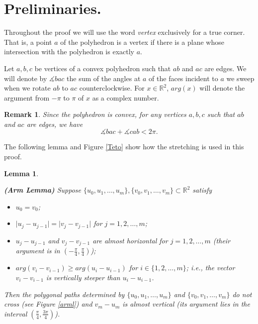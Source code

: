 \documentclass{article}
\theoremstyle{theorem}
\newtheorem{lema}[teorema]{Lemma}
\newtheorem{rem}[teorema]{Remark}
\newcommand{\field}[1]{\ensuremath{\mathbb{#1}}}
\newcommand{\R}{\field{R}}
\begin{document}
\section*{Preliminaries.}

Throughout the proof we will use the word \textit{vertex} exclusively for a true corner. That is, a point $a$ of the polyhedron is a vertex if there is a plane whose intersection with the polyhedron is exactly $a$.


Let $a, b, c$ be vertices of a convex polyhedron such that $ab $ and $ac$ are edges. We will denote by $\measuredangle bac $ the sum of the angles at $a$ of the faces incident to $a$ we sweep when we rotate $ab$ to $ac$ counterclockwise. For $x \in \R^2$, $arg (x)$ will denote the argument from $-\pi$ to $\pi$ of $x$ as a complex number.%

\begin{rem}
{\rm Since the polyhedron is convex, for any vertices $a,b,c$ such that $ab$ and $ac$ are edges, we have
\begin{equation}\label{Alex}
\measuredangle bac + \measuredangle  cab  < 2\pi.
\end{equation} 
}
 \end{rem}

The following lemma and Figure \ref{Teto} show how the stretching is used in this proof.

\begin{lema} \label{Arm}
{\textbf{(Arm Lemma)} Suppose $\{ u_0, u_1, \ldots , u_m     \}, \{ v_0, v_1, \ldots , v_m      \} \subset \R^2$ satisfy
\begin{itemize}
\item $u_0 = v_0$;
\item $\vert u_j - u_{j-1} \vert = \vert v_j - v_{j-1}  \vert$ for $j=1,2, \ldots, m$;
\item $u_{j }- u_{j-1} $ and $v_j - v_{j-1} $ are almost horizontal for $j = 1, 2, \ldots , m$ (their argument is in $\left( -\frac{\pi}{4},\frac{\pi}{4} \right)$); 
\item $arg (v_{i} - v_{i-1} )\geq arg (u_{i} - u_{i-1})$ for $i \in \{ 1, 2, \ldots, m \} $; i.e., the vector $v_i - v_{i-1} $ is vertically steeper than $u_i-u_{i-1}$. 
\end{itemize}

\noindent Then the polygonal paths determined by $\{ u_0, u_1, \ldots , u_m     \}$ and $ \{ v_0, v_1, \ldots , v_m      \}$ do not cross (see Figure \ref{arml}) and $v_m - u_m$ is almost vertical (its argument lies in the interval $\left(   \frac{\pi}{4} , \frac{3\pi}{4}  \right)$). 
}
\end{lema}
\end{document}
